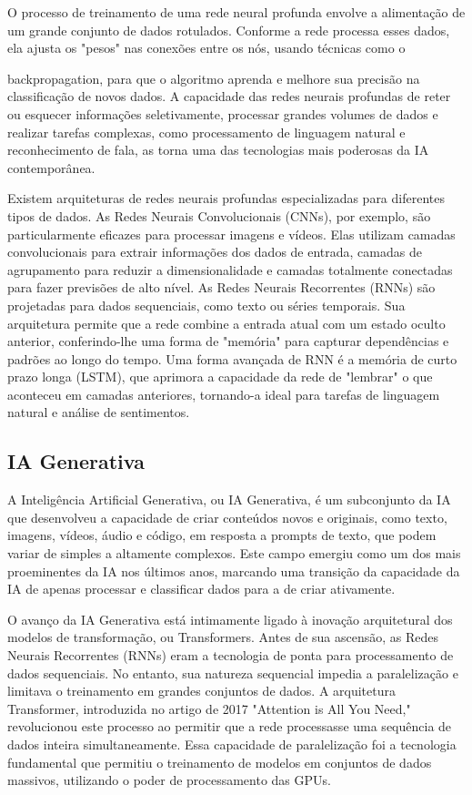 O processo de treinamento de uma rede neural profunda envolve a alimentação de um grande conjunto de dados rotulados. Conforme a rede processa esses dados, ela ajusta os "pesos" nas conexões entre os nós, usando técnicas como o

backpropagation, para que o algoritmo aprenda e melhore sua precisão na classificação de novos dados. A capacidade das redes neurais profundas de reter ou esquecer informações seletivamente, processar grandes volumes de dados e realizar tarefas complexas, como processamento de linguagem natural e reconhecimento de fala, as torna uma das tecnologias mais poderosas da IA contemporânea.

Existem arquiteturas de redes neurais profundas especializadas para diferentes tipos de dados. As Redes Neurais Convolucionais (CNNs), por exemplo, são particularmente eficazes para processar imagens e vídeos. Elas utilizam camadas convolucionais para extrair informações dos dados de entrada, camadas de agrupamento para reduzir a dimensionalidade e camadas totalmente conectadas para fazer previsões de alto nível. As Redes Neurais Recorrentes (RNNs) são projetadas para dados sequenciais, como texto ou séries temporais. Sua arquitetura permite que a rede combine a entrada atual com um estado oculto anterior, conferindo-lhe uma forma de "memória" para capturar dependências e padrões ao longo do tempo. Uma forma avançada de RNN é a memória de curto prazo longa (LSTM), que aprimora a capacidade da rede de "lembrar" o que aconteceu em camadas anteriores, tornando-a ideal para tarefas de linguagem natural e análise de sentimentos.

\subsection{IA Generativa}

A Inteligência Artificial Generativa, ou IA Generativa, é um subconjunto da IA que desenvolveu a capacidade de criar conteúdos novos e originais, como texto, imagens, vídeos, áudio e código, em resposta a prompts de texto, que podem variar de simples a altamente complexos. Este campo emergiu como um dos mais proeminentes da IA nos últimos anos, marcando uma transição da capacidade da IA de apenas processar e classificar dados para a de criar ativamente.

O avanço da IA Generativa está intimamente ligado à inovação arquitetural dos modelos de transformação, ou Transformers. Antes de sua ascensão, as Redes Neurais Recorrentes (RNNs) eram a tecnologia de ponta para processamento de dados sequenciais. No entanto, sua natureza sequencial impedia a paralelização e limitava o treinamento em grandes conjuntos de dados. A arquitetura Transformer, introduzida no artigo de 2017 "Attention is All You Need," revolucionou este processo ao permitir que a rede processasse uma sequência de dados inteira simultaneamente. Essa capacidade de paralelização foi a tecnologia fundamental que permitiu o treinamento de modelos em conjuntos de dados massivos, utilizando o poder de processamento das GPUs.


